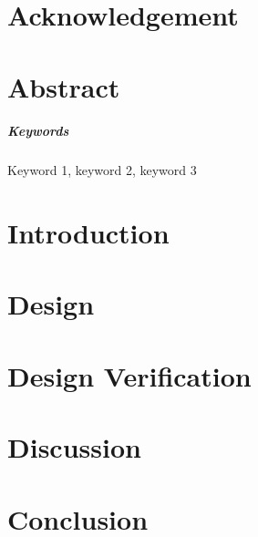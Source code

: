 \documentclass{senior-design}
\begin{document}
\individualreportcover %
\generalreportcover %
\addemptypage
\frontmatter

\chapter*{Acknowledgement}



\chapter*{Abstract}

\paragraph{Keywords}
Keyword 1, keyword 2, keyword 3

\tableofcontents

\mainmatter
\chapter{Introduction}

\chapter{Design}

\chapter{Design Verification}

\chapter{Discussion}

\chapter{Conclusion}
\end{document}
